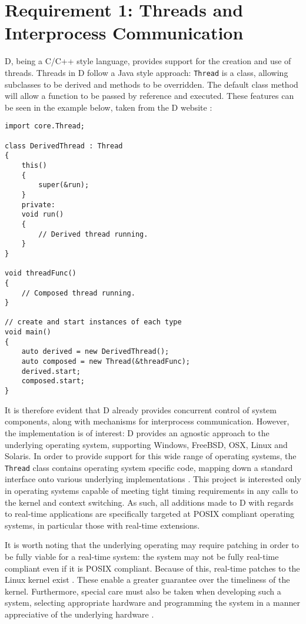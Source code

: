 \section{Requirement 1: Threads and Interprocess Communication}
D, being a C/C++ style language, provides support for the creation and use of 
threads. Threads in D follow a Java style approach: \texttt{Thread} is a class, 
allowing subclasses to be derived and methods to be overridden. The default 
class method will allow a function to be passed by reference and executed. 
These features can be seen in the example below, taken from the D website
\cite{core-thread}: 
\begin{lstlisting}
import core.Thread; 

class DerivedThread : Thread
{
    this()
    {
        super(&run);
    }
    private:
    void run()
    {
        // Derived thread running.
    }
}

void threadFunc()
{
    // Composed thread running.
}

// create and start instances of each type
void main()
{
    auto derived = new DerivedThread();
    auto composed = new Thread(&threadFunc);
    derived.start; 
    composed.start;
}
\end{lstlisting}
It is therefore evident that D already provides 
concurrent control of system components, along with mechanisms for 
interprocess communication. However, the implementation is of interest: D 
provides an agnostic approach to the underlying operating system, supporting 
Windows, FreeBSD, OSX, Linux and Solaris. 
In order to provide support for this wide range of operating systems, the 
\texttt{Thread}
class contains operating system specific code, mapping down a standard interface 
onto various underlying implementations 
\cite{github-core-thread}. 
This project is interested only in operating systems capable of meeting tight timing 
requirements in any calls to the kernel and context switching.
As such, all additions made to D with regards to real-time applications are 
specifically targeted at POSIX compliant 
operating systems, in particular those with real-time extensions. 
\par\bigskip\noindent
It is worth noting that the underlying operating may require patching in order 
to be fully viable for a real-time system: the system may not be fully
real-time compliant even if it is POSIX compliant. Because of this, real-time patches 
to the Linux kernel exist \cite{rt-wiki}. These enable a greater 
guarantee over the timeliness of the kernel. 
Furthermore, special care must also be taken when developing such a system,
selecting appropriate hardware and programming the system in a manner appreciative 
of the underlying hardware \cite{rt-wiki-how-to}.

